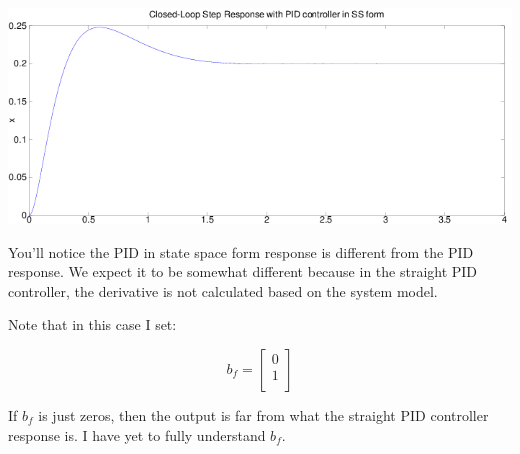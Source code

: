\documentclass[10pt,letterpaper]{article}
\begin{document}
\begin{center}
\includegraphics[scale=0.6]{image-pid-ss}
\end{center}

You'll notice the PID in state space form response is different from the PID response. We expect it to be somewhat different because in the straight PID controller, the derivative is not calculated based on the system model.

Note that in this case I set:

\[
b_f = \begin{bmatrix}
	0 \\
	1 \\
\end{bmatrix}
\]

If $b_f$ is just zeros, then the output is far from what the straight PID controller response is. I have yet to fully understand $b_f$.
\end{document}

